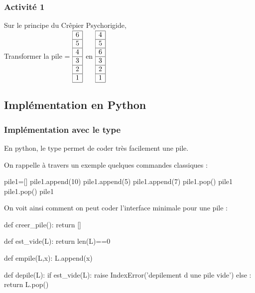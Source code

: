 \documentclass[11pt,a4paper,french,twoside]{PMCours}
\begin{document}
\subsubsection*{Activité 1}
Sur le principe du Crêpier Psychorigide,\medskip\\
Transformer la pile \hskip 5mm = {\footnotesize$\begin{array}{|c|}\hline6\\\hline5
\\\hline4\\\hline3\\\hline2\\\hline1\\\hline\end{array}$}\hskip 5mm  en \hskip 5mm 
{\footnotesize$\begin{array}{|c|}\hline4\\\hline5\\\hline6\\\hline 
3\\\hline2\\\hline1\\\hline\end{array}$}
\vfill \noindent
\subsection{Implémentation en Python}
\subsubsection{Implémentation avec le type \texorpdfstring{}{list}}
En python, le type  permet de coder très facilement une pile.

On rappelle à travers un exemple quelques commandes classiques :
\begin{Python}
pile1=[]
pile1.append(10)
pile1.append(5)
pile1.append(7)
pile1.pop()
pile1
pile1.pop()
pile1
\end{Python}

On voit ainsi comment on peut coder l'interface minimale pour une pile :
\begin{Python}
def creer_pile():
    return []
    
def est_vide(L):
    return len(L)==0

def empile(L,x):
    L.append(x)

def depile(L):
    if est_vide(L):
        raise IndexError('depilement d une pile vide')
    else :
        return L.pop()
\end{Python}%
\end{document}
